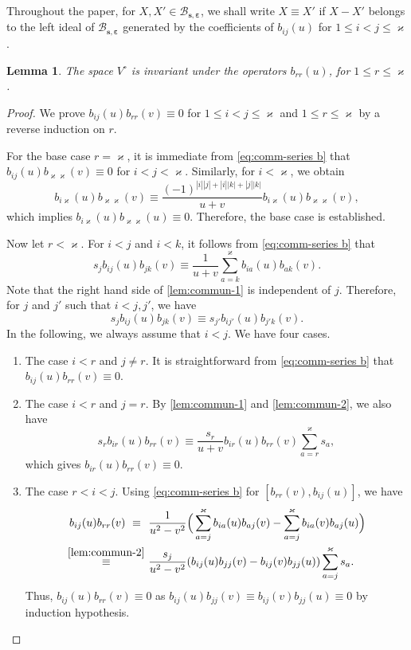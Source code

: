 \documentclass[11pt,reqno]{amsart}
\numberwithin{equation}{section}
\newtheorem{lem}[thm]{Lemma}
\theoremstyle{definition}
\theoremstyle{remark}
\newcommand{\beq}{\begin{equation}}
\newcommand{\eeq}{\end{equation}}
\newcommand{\lle}{\leqslant}
\newcommand{\BMN}{{\mathscr{B}_{\bm s,\bm \ve}}}
\newcommand{\ka}{\varkappa}
\newcommand{\ve}{\varepsilon}
\begin{document}
Throughout the paper, for $X,X'\in \BMN$, we shall write $X\equiv X'$ if $X-X'$ belongs to the left ideal of $\BMN$ generated by the coefficients of $b_{ij}(u)$ for $1\lle i<j\lle \ka$.

\begin{lem}\label{lem:invariant}
The space $V^\circ$ is invariant under the operators $b_{rr}(u)$, for $1\lle r\lle \ka$.
\end{lem}
\begin{proof}
We prove $b_{ij}(u)b_{rr}(v)\equiv 0$ for $1\lle i<j\lle \ka$ and $1\lle r\lle \ka$ by a reverse induction on $r$.

For the base case $r=\ka$, it is immediate from \eqref{eq:comm-series b} that $b_{ij}(u)b_{\ka \ka}(v)\equiv 0$ for $i<j<\ka$. Similarly, for $i<\ka$, we obtain
$$
b_{i\ka}(u)b_{\ka \ka}(v)\equiv \frac{(-1)^{|i||j|+|i||k|+|j||k|}}{u+v}b_{i\ka}(u)b_{\ka \ka}(v),
$$
which implies $b_{i\ka}(u)b_{\ka \ka}(u)\equiv 0$. Therefore, the base case is established.

Now let $r<\ka$. For $i<j$ and $i<k$, it follows from \eqref{eq:comm-series b} that
\beq\label{lem:commun-1}
s_j b_{ij}(u)b_{jk}(v)\equiv \frac{1}{u+v}\sum_{a=k}^{\ka} b_{ia}(u)b_{ak}(v).
\eeq
Note that the right hand side of \eqref{lem:commun-1} is independent of $j$. Therefore, for $j$ and $j'$ such that $i<j,j'$, we have
\beq\label{lem:commun-2}
s_j b_{ij}(u)b_{jk}(v)\equiv s_{j'} b_{ij'}(u)b_{j'k}(v).
\eeq
In the following, we always assume that $i<j$. We have four cases.

\begin{enumerate}
\item The case $i<r$ and $j\ne r$. It is straightforward from \eqref{eq:comm-series b} that $b_{ij}(u)b_{rr}(v)\equiv 0$.

\item The case $i<r$ and $j=r$. By \eqref{lem:commun-1} and \eqref{lem:commun-2}, we also have
\[
s_r b_{ir}(u)b_{rr}(v)\equiv \frac{s_r}{u+v}b_{ir}(u)b_{rr}(v)\sum_{a=r}^{\ka} s_a,
\]
which gives $b_{ir}(u)b_{rr}(v)\equiv 0$.

\item The case $r<i<j$. Using \eqref{eq:comm-series b} for $[b_{rr}(v),b_{ij}(u)]$, we have
\begin{align*}
b_{ij}(u)b_{rr}(v) \ \equiv \ & \ \frac{1}{u^2-v^2}\Big(\sum_{a=j}^\ka b_{ia}(u)b_{aj}(v)-\sum_{a=j}^\ka b_{ia}(v)b_{aj}(u)\Big)\\
\stackrel{\eqref{lem:commun-2}}{\equiv}  & \ \frac{s_j}{u^2-v^2}(b_{ij}(u)b_{jj}(v)-b_{ij}(v)b_{jj}(u))\sum_{a=j}^{\ka} s_a.
\end{align*}
Thus, $b_{ij}(u)b_{rr}(v) \equiv 0$ as $b_{ij}(u)b_{jj}(v)\equiv b_{ij}(v)b_{jj}(u)\equiv 0$ by induction hypothesis.


\end{enumerate}
\end{proof}
\end{document}
